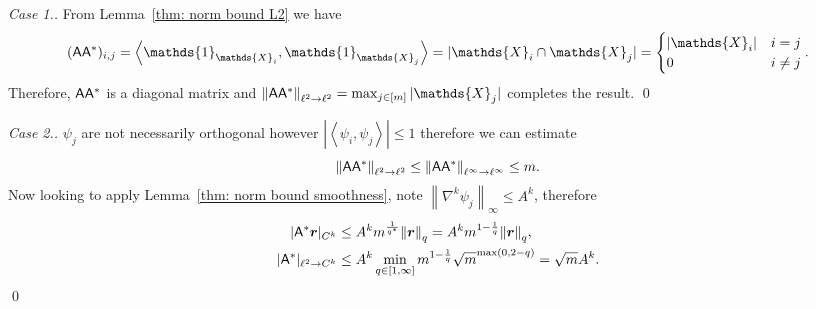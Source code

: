 \documentclass[smallextended]{svjour3}
\let\F\mathds\let\C\mathcal\newcommand{\R}{\F{R}}\newcommand{\A}{\tens{A}}
\newcommand{\norm}[1]{{\left\lVert #1 \right\rVert}}
\newcommand{\IP}[2]{\left\langle #1,#2 \right\rangle}
\newcommand{\splitln}[4]{\begin{cases} #1 & #2 \\ #3 & #4\end{cases}}
\newcommand{\1}{\F{1}}
\begin{document}
	\begin{proof}[Case 1.]
		From Lemma~\ref{thm: norm bound L2} we have 
		\begin{equation}
			(\A\A^*)_{i,j} = \IP{\1_{\F{X}_i}}{\1_{\F{X}_j}} = |\F{X}_i\cap \F{X}_j| = \splitln{|\F{X}_i|}{i=j}{0}{i\neq j}.
		\end{equation}
		Therefore, $\A\A^*$ is a diagonal matrix and $\norm{\A\A^*}_{\ell^2\to\ell^2} = \max_{j\in[m]} |\F{X}_j|$ completes the result.
		\qed\end{proof}
	
	\begin{proof}[Case 2.]
		$\psi_j$ are not necessarily orthogonal however $|\IP{\psi_i}{\psi_j}|\leq 1$ therefore we can estimate
		\begin{equation}
			\norm{\A\A^*}_{\ell^2\to\ell^2} \leq \norm{\A\A^*}_{\ell^\infty\to\ell^\infty} \leq m.
		\end{equation}
		Now looking to apply Lemma~\ref{thm: norm bound smoothness}, note $\norm{\nabla^k\psi_j}_\infty \leq A^k$, therefore
		\begin{align}
			|\A^*\vec{r}|_{C^k}&\leq A^k m^{\frac1{q^*}}\norm{\vec{r}}_q = A^k m^{1-\frac1{q}}\norm{\vec{r}}_q,
			\\|\A^*|_{\ell^2\to C^k} &\leq A^k \min_{q\in[1,\infty]}m^{1-\frac1q}\sqrt{m}^{\max(0,2-q)} = \sqrt{m}A^k.
		\end{align}
		\qed\end{proof}
	
\end{document}

